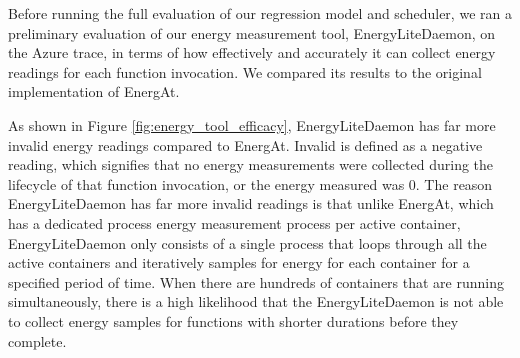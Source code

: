 \documentclass[times, 10pt,twocolumn]{article}
\begin{document}
Before running the full evaluation of our regression model and scheduler, we ran a preliminary evaluation of our energy measurement tool, EnergyLiteDaemon, on the Azure trace, in terms of how effectively and accurately it can collect energy readings for each function invocation. We compared its results to the original implementation of EnergAt.  

As shown in Figure \ref{fig:energy_tool_efficacy}, EnergyLiteDaemon has far more invalid energy readings compared to EnergAt. Invalid is defined as a negative reading, which signifies that no energy measurements were collected during the lifecycle of that function invocation, or the energy measured was 0. The reason EnergyLiteDaemon has far more invalid readings is that unlike EnergAt, which has a dedicated process energy measurement process per active container, EnergyLiteDaemon only consists of a single process that loops through all the active containers and iteratively samples for energy for each container for a specified period of time. When there are hundreds of containers that are running simultaneously, there is a high likelihood that the EnergyLiteDaemon is not able to collect energy samples for functions with shorter durations before they complete. 
\end{document}
